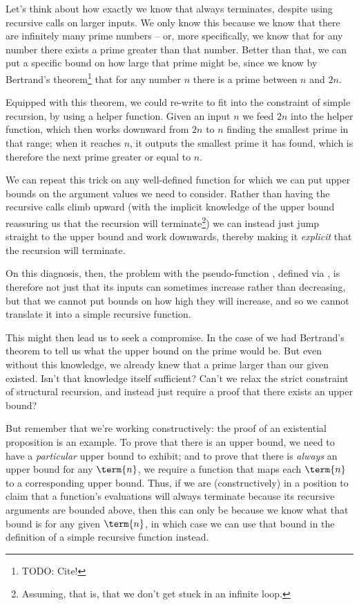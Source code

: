 Let's think about how exactly we know that  always terminates, despite using recursive calls on larger inputs.  We only know this because we know that there are infinitely many prime numbers -- or, more specifically, we know that for any number there exists a prime greater than that number.  Better than that, we can put a specific bound on how large that prime might be, since we know by Bertrand's theorem\footnote{
TODO: Cite!} that for any number $n$ there is a prime between $n$ and $2n$.

Equipped with this theorem, we could re-write  to fit into the constraint of simple recursion, by using a helper function. Given an input $n$ we feed $2n$ into the helper function, which then works downward from $2n$ to $n$ finding the smallest prime in that range; when it reaches $n$, it outputs the smallest prime it has found, which is therefore the next prime greater or equal to $n$.

We can repeat this trick on any well-defined function for which we can put upper bounds on the argument values we need to consider.  Rather than having the recursive calls climb upward (with the implicit knowledge of the upper bound reassuring us that the recursion will terminate\footnote{
Assuming, that is, that we don't get stuck in an infinite loop.
}) 
we can instead just jump straight to the upper bound and work downwards, thereby making it \emph{explicit} that the recursion will terminate.

On this diagnosis, then, the problem with the pseudo-function , defined via , is therefore not just that its inputs can sometimes increase rather than decreasing, but that we cannot put bounds on how high they will increase, and so we cannot translate it into a simple recursive function.

This might then lead us to seek a compromise.  In the case of  we had Bertrand's theorem to tell us what the upper bound on the prime would be.  But even without this knowledge, we already knew that a prime larger than our given  existed.  Isn't that knowledge itself sufficient?  Can't we relax the strict constraint of structural recursion, and instead just require a proof that there exists an upper bound?  

But remember that we're working constructively: the proof of an existential proposition is an example.  To prove that there is an upper bound, we need to have a \emph{particular} upper bound to exhibit; and to prove that there is \emph{always} an upper bound for any $\term{n}$, we require a function that maps each $\term{n}$ to a corresponding upper bound.  Thus, if we are (constructively) in a position to claim that a function's evaluations will always terminate because its recursive arguments are bounded above, then this can only be because we know what that bound is for any given $\term{n}$, in which case we can use that bound in the definition of a simple recursive function instead.

